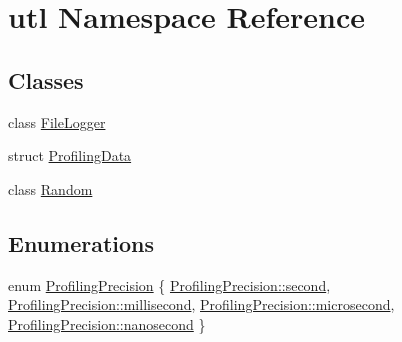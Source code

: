 \hypertarget{namespaceutl}{}\section{utl Namespace Reference}
\label{namespaceutl}
\subsection*{Classes}
\begin{DoxyCompactItemize}
\item 
class \mbox{\hyperlink{classutl_1_1_file_logger}{File\+Logger}}
\item 
struct \mbox{\hyperlink{structutl_1_1_profiling_data}{Profiling\+Data}}
\item 
class \mbox{\hyperlink{classutl_1_1_random}{Random}}
\end{DoxyCompactItemize}
\subsection*{Enumerations}
\begin{DoxyCompactItemize}
\item 
enum \mbox{\hyperlink{namespaceutl_ad221bb3fac593651670bdc0263b92707}{Profiling\+Precision}} \{ \mbox{\hyperlink{namespaceutl_ad221bb3fac593651670bdc0263b92707aa9f0e61a137d86aa9db53465e0801612}{Profiling\+Precision\+::second}}, 
\mbox{\hyperlink{namespaceutl_ad221bb3fac593651670bdc0263b92707a407aa8403e413c457b081a9dc095a285}{Profiling\+Precision\+::millisecond}}, 
\mbox{\hyperlink{namespaceutl_ad221bb3fac593651670bdc0263b92707af4b6d59819445e05b152c708db4ede10}{Profiling\+Precision\+::microsecond}}, 
\mbox{\hyperlink{namespaceutl_ad221bb3fac593651670bdc0263b92707a0d7938bf86d4dc7a82f872433a9e1a1c}{Profiling\+Precision\+::nanosecond}}
 \}
\end{DoxyCompactItemize}
